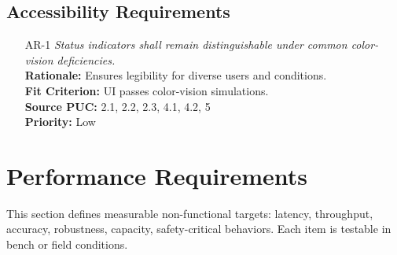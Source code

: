 \documentclass[12pt]{article}
\begin{document}
\subsection{Accessibility Requirements}
\begin{itemize}[leftmargin=*]
  \item[AR-1] \emph{Status indicators shall remain distinguishable under common
          color-vision deficiencies.}\\[2mm]
        \textbf{Rationale:} Ensures legibility for diverse users and conditions.\\
        \textbf{Fit Criterion:} UI passes color-vision simulations.\\
        \textbf{Source PUC:} 2.1, 2.2, 2.3, 4.1, 4.2, 5 \\
        \textbf{Priority:} Low
\end{itemize}

\section{Performance Requirements}
This section defines measurable non-functional targets: latency, throughput,
accuracy, robustness, capacity, safety-critical behaviors. Each item is
testable in bench or field conditions.
\end{document}
